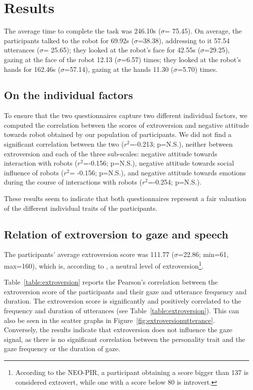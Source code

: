 \section{Results}

The average time to complete the task was 246.10s ($\sigma$= 75.45). 
On average, the participants talked to the robot for 69.92s ($\sigma$=38.38), addressing to it 57.54 utterances ($\sigma$= 25.65); they looked at the robot's face for 42.55s ($\sigma$=29.25), gazing at the face of the robot 12.13 ($\sigma$=6.57) times; they looked at the robot's hands for 162.46s ($\sigma$=57.14), gazing at the hands 11.30 ($\sigma$=5.70) times.


\subsection{On the individual factors}
To ensure that the two questionnaires capture two different individual factors, we computed the correlation between the scores of extroversion and negative attitude towards robot obtained by our population of participants.
We did not find a significant correlation between the two ($r^2$=-0.213; p=N.S.), neither between extroversion and  
each of the three sub-scales: negative attitude towards interaction with robots ($r^2$=-0.156; p=N.S.), negative attitude towards social influence of robots ($r^2$= -0.156; p=N.S.), and negative attitude towards emotions during the course of interactions with robots ($r^2$=-0.254; p=N.S.). 

These results seem to indicate that both questionnaires represent a fair valuation of the different individual traits of the participants. 


\subsection{Relation of extroversion to gaze and speech}\label{sec:extro}

The participants' average extroversion score was 111.77 ($\sigma$=22.86; min=61, max=160), which is, according to \cite{NEOPIR1998}, a neutral level of extroversion\footnote{According to the NEO-PIR, a participant obtaining a score bigger than 137 is considered extrovert, while one with a score below 80 is introvert.}. 

Table~\ref{table:extroversion} reports the Pearson's correlation between the extroversion score of the participants and their gaze and utterance frequency and duration. 
The extroversion score is significantly and positively correlated to the frequency and duration of utterances (see Table~\ref{table:extroversion}). This can also be seen in the scatter graphs in Figure~\ref{fig:extroversionutterance}.
Conversely, the results indicate that extroversion does not influence the gaze signal, as there is no significant correlation between the personality trait and the gaze frequency or the duration of gaze.

